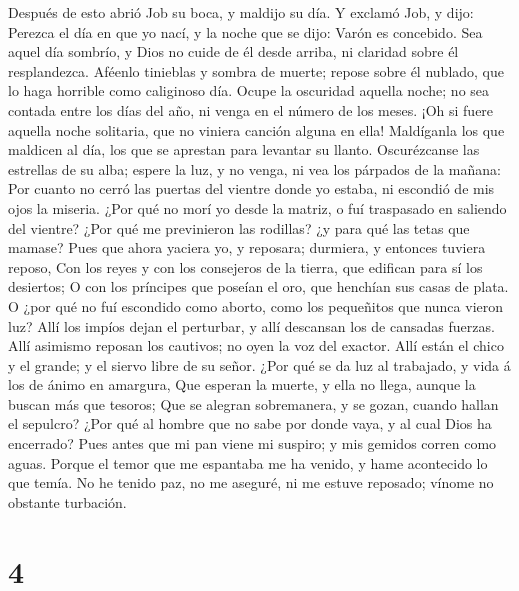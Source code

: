  Después de esto abrió Job su boca, y maldijo su día.
 Y exclamó Job, y dijo:  Perezca el día en que
yo nací, y la noche que se dijo: Varón es concebido.  Sea
aquel día sombrío, y Dios no cuide de él desde arriba, ni claridad sobre
él resplandezca.  Aféenlo tinieblas y sombra de muerte;
repose sobre él nublado, que lo haga horrible como caliginoso día.
 Ocupe la oscuridad aquella noche; no sea contada entre los
días del año, ni venga en el número de los meses.  ¡Oh si
fuere aquella noche solitaria, que no viniera canción alguna en ella!
 Maldíganla los que maldicen al día, los que se aprestan
para levantar su llanto.  Oscurézcanse las estrellas de su
alba; espere la luz, y no venga, ni vea los párpados de la mañana:
 Por cuanto no cerró las puertas del vientre donde yo
estaba, ni escondió de mis ojos la miseria.  ¿Por qué no
morí yo desde la matriz, o fuí traspasado en saliendo del vientre?
 ¿Por qué me previnieron las rodillas? ¿y para qué las
tetas que mamase?  Pues que ahora yaciera yo, y reposara;
durmiera, y entonces tuviera reposo,  Con los reyes y con
los consejeros de la tierra, que edifican para sí los desiertos;
 O con los príncipes que poseían el oro, que henchían sus
casas de plata.  O ¿por qué no fuí escondido como aborto,
como los pequeñitos que nunca vieron luz?  Allí los impíos
dejan el perturbar, y allí descansan los de cansadas fuerzas.
 Allí asimismo reposan los cautivos; no oyen la voz del
exactor.  Allí están el chico y el grande; y el siervo
libre de su señor.  ¿Por qué se da luz al trabajado, y vida
á los de ánimo en amargura,  Que esperan la muerte, y ella
no llega, aunque la buscan más que tesoros;  Que se alegran
sobremanera, y se gozan, cuando hallan el sepulcro?  ¿Por
qué al hombre que no sabe por donde vaya, y al cual Dios ha encerrado?
 Pues antes que mi pan viene mi suspiro; y mis gemidos
corren como aguas.  Porque el temor que me espantaba me ha
venido, y hame acontecido lo que temía.  No he tenido paz,
no me aseguré, ni me estuve reposado; vínome no obstante turbación.

\hypertarget{section-3}{%
\section{4}\label{section-3}}

